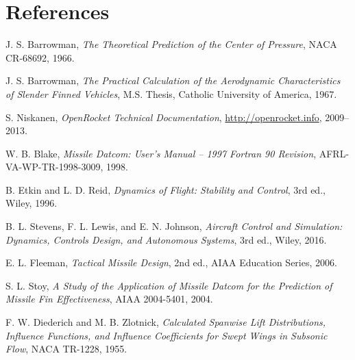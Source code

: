 \documentclass[11pt]{article}
\begin{document}
\section*{References}
\begin{thebibliography}{9}
J. S. Barrowman,
\emph{The Theoretical Prediction of the Center of Pressure},
NACA CR-68692, 1966.

J. S. Barrowman,
\emph{The Practical Calculation of the Aerodynamic Characteristics of Slender Finned Vehicles},
M.S. Thesis, Catholic University of America, 1967.

S. Niskanen,
\emph{OpenRocket Technical Documentation},
\url{http://openrocket.info}, 2009--2013.

W. B. Blake,
\emph{Missile Datcom: User's Manual -- 1997 Fortran 90 Revision},
AFRL-VA-WP-TR-1998-3009, 1998.

B. Etkin and L. D. Reid,
\emph{Dynamics of Flight: Stability and Control},
3rd ed., Wiley, 1996.

B. L. Stevens, F. L. Lewis, and E. N. Johnson,
\emph{Aircraft Control and Simulation: Dynamics, Controls Design, and Autonomous Systems},
3rd ed., Wiley, 2016.

E. L. Fleeman,
\emph{Tactical Missile Design},
2nd ed., AIAA Education Series, 2006.

S. L. Stoy,
\emph{A Study of the Application of Missile Datcom for the Prediction of Missile Fin Effectiveness},
AIAA 2004-5401, 2004.

F. W. Diederich and M. B. Zlotnick,
\emph{Calculated Spanwise Lift Distributions, Influence Functions, and Influence Coefficients for Swept Wings in Subsonic Flow},
NACA TR-1228, 1955.
\end{thebibliography}
\end{document}

